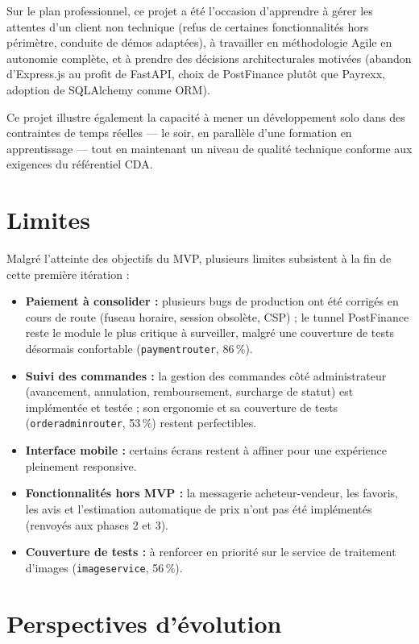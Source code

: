 \documentclass[12pt, a4paper]{report}
\renewcommand{\_}{\origunderscore\allowbreak}
\begin{document}
\noindent Sur le plan professionnel, ce projet a été l'occasion d'apprendre à gérer les attentes d'un client non technique (refus de certaines fonctionnalités hors périmètre, conduite de démos adaptées), à travailler en méthodologie Agile en autonomie complète, et à prendre des décisions architecturales motivées (abandon d'Express.js au profit de FastAPI, choix de PostFinance plutôt que Payrexx, adoption de SQLAlchemy comme ORM).

\noindent Ce projet illustre également la capacité à mener un développement solo dans des contraintes de temps réelles — le soir, en parallèle d'une formation en apprentissage — tout en maintenant un niveau de qualité technique conforme aux exigences du référentiel CDA.

\section*{Limites}

Malgré l'atteinte des objectifs du MVP, plusieurs limites subsistent à la fin de cette première itération :

\begin{itemize}
    \item \textbf{Paiement à consolider :} plusieurs bugs de production ont été corrigés en cours de route (fuseau horaire, session obsolète, CSP) ; le tunnel PostFinance reste le module le plus critique à surveiller, malgré une couverture de tests désormais confortable (\texttt{payment\_router}, 86\,\%).
    \item \textbf{Suivi des commandes :} la gestion des commandes côté administrateur (avancement, annulation, remboursement, surcharge de statut) est implémentée et testée ; son ergonomie et sa couverture de tests (\texttt{order\_admin\_router}, 53\,\%) restent perfectibles.
    \item \textbf{Interface mobile :} certains écrans restent à affiner pour une expérience pleinement responsive.
    \item \textbf{Fonctionnalités hors MVP :} la messagerie acheteur-vendeur, les favoris, les avis et l'estimation automatique de prix n'ont pas été implémentés (renvoyés aux phases 2 et 3).
    \item \textbf{Couverture de tests :} à renforcer en priorité sur le service de traitement d'images (\texttt{image\_service}, 56\,\%).
\end{itemize}

\section*{Perspectives d'évolution}
\end{document}
